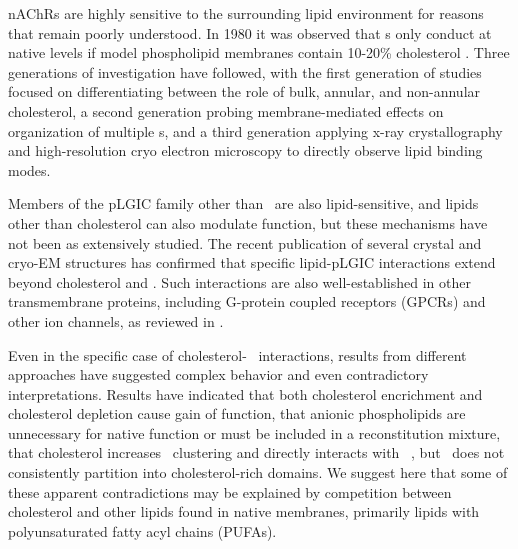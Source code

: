 nAChRs are highly sensitive to the surrounding lipid environment\cite{Hamouda2006a,Baenziger2017,Padilla-Morales2016,Barrantes2007} for reasons that remain poorly understood. In 1980 it was observed that \nachr s only conduct at native levels if model phospholipid membranes contain 10-20\% cholesterol
\cite{Dalziel1980,Criado1982,Ochoa1983}. Three generations of investigation have followed, with the first generation of studies\cite{Marsh1978,Dalziel1980,Marsh1981,Criado1982,Gonzalez-Ros1982,McNamee1982,Ellena1983,Ochoa1983,Zabrecky1985,Bristow1987,Leibel1987,Middlemas1987,Jones1988a,Jones1988, Fong1986,Fong1987,McNamee1988, Barrantes1989,Sunshine1992,Sunshine1994,Narayanaswami1993,Addona1998,Corbin1998,Barrantes2000} focused on differentiating between the role of bulk, annular, and non-annular cholesterol, a second generation\cite{Baenziger2015,Bruses2001,Marchand2002,Oshikawa2003,Pato2008,Zhu2006,Baenziger2017, Barrantes2007,Barrantes2000,Barrantes2010,Bermudez2010,Perillo2016,Wenz2005,Borroni2016, Unwin2017} probing membrane-mediated effects on organization of multiple \nachr s, and a third generation\cite{Basak2017,Althoff2014,Laverty2017,Zhu2018} applying x-ray crystallography and high-resolution cryo electron microscopy to directly observe lipid binding modes. 

Members of the pLGIC family other than \nachr~are also lipid-sensitive,\cite{Dunn1989,Sooksawate2001,Baenziger2011, Dostalova2014} and lipids other than cholesterol can also modulate function\cite{Bhushan1993,Cheng2007,Corrie2002a,DaCosta2002,Rankin1997,Wenz2005,Hamouda2006a}, but these mechanisms have not been as extensively studied.  The recent publication of several crystal and cryo-EM structures \cite{Basak2017,Althoff2014,Laverty2017,Zhu2018}
has confirmed that specific lipid-pLGIC interactions extend beyond cholesterol and \nachr.  Such interactions are also well-established in other transmembrane proteins, including G-protein coupled receptors (GPCRs) and other ion channels, as reviewed in \cite{Burger2000, Lee2004, Pucadyil2006a, Landreh2016, Smithers2012}. 

Even in the specific case of cholesterol-\nachr~ interactions, results from different approaches have suggested complex behavior and even contradictory interpretations.  Results have indicated that both cholesterol encrichment\cite{Dalziel1980,Criado1982,Ochoa1983} and cholesterol depletion\cite{Santiago2001} cause gain of function, that anionic phospholipids are unnecessary for native function\cite{Dalziel1980,Criado1982,Ochoa1983} or must be\cite{Corrie2002a,DaCosta2002} included in a reconstitution mixture,  that cholesterol increases \nachr~clustering\cite{Pato2008, Zhu2006, Barrantes2007} and directly interacts with \nachr~\cite{Leibel1987,Jones1988}, but \nachr~does not consistently partition into cholesterol-rich domains\cite{Bermdez_Partition_2010}. We suggest here that some of these apparent contradictions may be explained by competition between cholesterol and other lipids found in native membranes, primarily lipids with polyunsaturated fatty acyl chains (PUFAs).   

